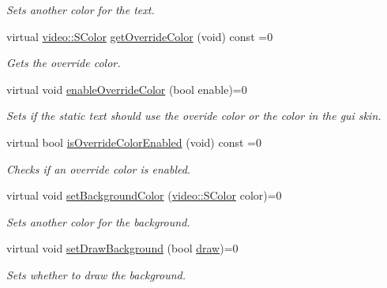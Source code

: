 \begin{DoxyCompactItemize}
\begin{DoxyCompactList}\small\item\em Sets another color for the text. \end{DoxyCompactList}\item 
virtual \hyperlink{classirr_1_1video_1_1SColor}{video\+::\+S\+Color} \hyperlink{classirr_1_1gui_1_1IGUIStaticText_a9c4c43f262efd02a113da79bedb973e1}{get\+Override\+Color} (void) const =0
\begin{DoxyCompactList}\small\item\em Gets the override color. \end{DoxyCompactList}\item 
virtual void \hyperlink{classirr_1_1gui_1_1IGUIStaticText_ae1f432263d4c638b0441f8b993f301bc}{enable\+Override\+Color} (bool enable)=0
\begin{DoxyCompactList}\small\item\em Sets if the static text should use the overide color or the color in the gui skin. \end{DoxyCompactList}\item 
virtual bool \hyperlink{classirr_1_1gui_1_1IGUIStaticText_a67b17803b8ad73e8d687b23ad38db37e}{is\+Override\+Color\+Enabled} (void) const =0
\begin{DoxyCompactList}\small\item\em Checks if an override color is enabled. \end{DoxyCompactList}\item 
\mbox{\label{classirr_1_1gui_1_1IGUIStaticText_afe9b39a38851b8d4056a35e3d62996d6}} 
virtual void \hyperlink{classirr_1_1gui_1_1IGUIStaticText_afe9b39a38851b8d4056a35e3d62996d6}{set\+Background\+Color} (\hyperlink{classirr_1_1video_1_1SColor}{video\+::\+S\+Color} color)=0
\begin{DoxyCompactList}\small\item\em Sets another color for the background. \end{DoxyCompactList}\item 
\mbox{\label{classirr_1_1gui_1_1IGUIStaticText_aed8ab71280b2c1787c62565d199c0c34}} 
virtual void \hyperlink{classirr_1_1gui_1_1IGUIStaticText_aed8ab71280b2c1787c62565d199c0c34}{set\+Draw\+Background} (bool \hyperlink{classirr_1_1gui_1_1IGUIElement_a1ef7eeaff67b8a9f4f37cacdc7e54be2}{draw})=0
\begin{DoxyCompactList}\small\item\em Sets whether to draw the background. \end{DoxyCompactList}\item 

\end{DoxyCompactItemize}
